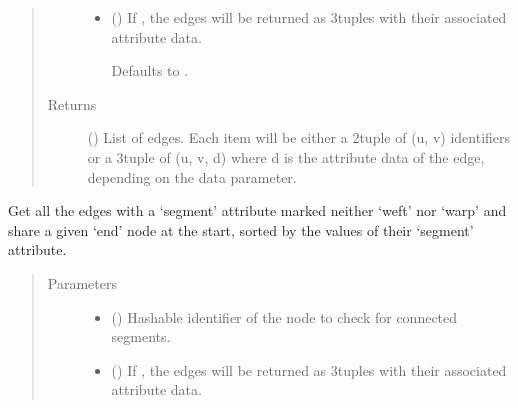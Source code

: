 \documentclass[letterpaper,10pt,english]{sphinxmanual}
\begin{document}
\begin{fulllineitems}
\begin{fulllineitems}
\begin{quote}
\begin{description}
\begin{itemize}
\item {} 
 (\sphinxstyleliteralemphasis{\sphinxupquote{, }}) \textendash{} 
If , the edges will be returned as 3\sphinxhyphen{}tuples with their
associated attribute data.

Defaults to .


\end{itemize}

\item[{Returns}] \leavevmode
{} () \textendash{} List of edges. Each item will be either a 2\sphinxhyphen{}tuple of (u, v)
identifiers or a 3\sphinxhyphen{}tuple of (u, v, d) where d is the attribute data
of the edge, depending on the data parameter.

\end{description}\end{quote}

\end{fulllineitems}


\begin{fulllineitems}
\label{\detokenize{cockatoo:cockatoo.KnitNetworkBase.end_node_segments_by_start}}
Get all the edges with a ‘segment’ attribute marked neither ‘weft’ nor
‘warp’ and share a given ‘end’ node at the start, sorted by the values
of their ‘segment’ attribute.
\begin{quote}\begin{description}
\item[{Parameters}] \leavevmode\begin{itemize}
\item {} 
 () \textendash{} Hashable identifier of the node to check for connected segments.

\item {} 
 (\sphinxstyleliteralemphasis{\sphinxupquote{, }}) \textendash{} 
If , the edges will be returned as 3\sphinxhyphen{}tuples with their
associated attribute data.


\end{itemize}
\end{description}
\end{quote}
\end{fulllineitems}
\end{fulllineitems}
\end{document}
